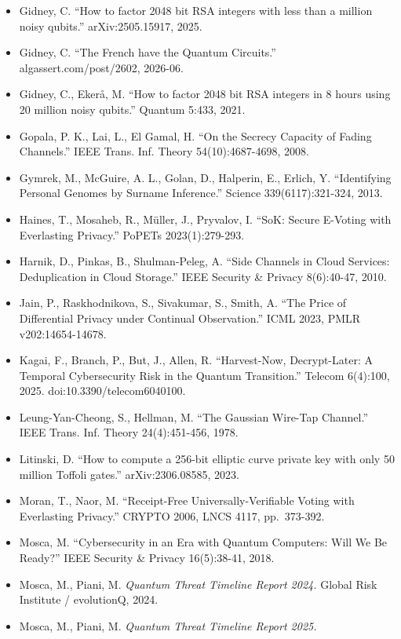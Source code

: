 \documentclass[
]{llncs}
\begin{document}
\begin{itemize}
\item
  Gidney, C. ``How to factor 2048 bit RSA integers with less than a
  million noisy qubits.'' arXiv:2505.15917, 2025.
\item
  Gidney, C. ``The French have the Quantum Circuits.''
  algassert.com/post/2602, 2026-06.
\item
  Gidney, C., Ekerå, M. ``How to factor 2048 bit RSA integers in 8 hours
  using 20 million noisy qubits.'' Quantum 5:433, 2021.
\item
  Gopala, P. K., Lai, L., El Gamal, H. ``On the Secrecy Capacity of
  Fading Channels.'' IEEE Trans. Inf. Theory 54(10):4687-4698, 2008.
\item
  Gymrek, M., McGuire, A. L., Golan, D., Halperin, E., Erlich, Y.
  ``Identifying Personal Genomes by Surname Inference.'' Science
  339(6117):321-324, 2013.
\item
  Haines, T., Mosaheb, R., Müller, J., Pryvalov, I. ``SoK: Secure
  E-Voting with Everlasting Privacy.'' PoPETs 2023(1):279-293.
\item
  Harnik, D., Pinkas, B., Shulman-Peleg, A. ``Side Channels in Cloud
  Services: Deduplication in Cloud Storage.'' IEEE Security \& Privacy
  8(6):40-47, 2010.
\item
  Jain, P., Raskhodnikova, S., Sivakumar, S., Smith, A. ``The Price of
  Differential Privacy under Continual Observation.'' ICML 2023, PMLR
  v202:14654-14678.
\item
  Kagai, F., Branch, P., But, J., Allen, R. ``Harvest-Now,
  Decrypt-Later: A Temporal Cybersecurity Risk in the Quantum
  Transition.'' Telecom 6(4):100, 2025. doi:10.3390/telecom6040100.
\item
  Leung-Yan-Cheong, S., Hellman, M. ``The Gaussian Wire-Tap Channel.''
  IEEE Trans. Inf. Theory 24(4):451-456, 1978.
\item
  Litinski, D. ``How to compute a 256-bit elliptic curve private key
  with only 50 million Toffoli gates.'' arXiv:2306.08585, 2023.
\item
  Moran, T., Naor, M. ``Receipt-Free Universally-Verifiable Voting with
  Everlasting Privacy.'' CRYPTO 2006, LNCS 4117, pp.~373-392.
\item
  Mosca, M. ``Cybersecurity in an Era with Quantum Computers: Will We Be
  Ready?'' IEEE Security \& Privacy 16(5):38-41, 2018.
\item
  Mosca, M., Piani, M. \emph{Quantum Threat Timeline Report 2024.}
  Global Risk Institute / evolutionQ, 2024.
\item
  Mosca, M., Piani, M. \emph{Quantum Threat Timeline Report 2025.}

\end{itemize}
\end{document}
